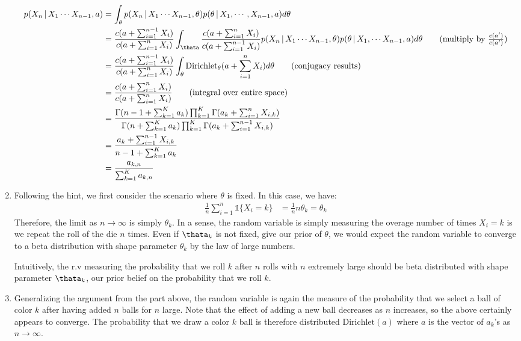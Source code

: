 \documentclass[submit]{harvardml}
\newcommand{\given}{\,|\,}
\theoremstyle{plain}
\begin{document}
\begin{enumerate}[label=(\alph*)]
\begin{align*}
p(X_n \given X_1 \cdots X_{n-1},a) &= \int_{\theta} p(X_n \given  X_1 \cdots X_{n-1}, \theta)p(\theta \given X_1, \cdots, X_{n-1}, a)  d\theta \\
&= \frac{c(a + \sum_{i=1}^{n-1}X_i)}{c(a + \sum_{i=1}^n X_i)} \int_{\thata} \frac{c(a + \sum_{i=1}^n X_i)}{c(a + \sum_{i=1}^{n-1}X_i)} p(X_n \given  X_1 \cdots X_{n-1}, \theta)p(\theta \given X_1, \cdots X_{n-1}, a) d\theta \tag{multiply by $\frac{c(a')}{c(a')}$} \\
&= \frac{c(a + \sum_{i=1}^{n-1}X_i)}{c(a + \sum_{i=1}^n X_i)} \int_{\theta} \text{Dirichlet}_{\theta}(a + \sum_{i=1}^n X_i) d\theta \tag{conjugacy results}\\
&= \frac{c(a + \sum_{i=1}^n X_i)}{c(a + \sum_{i=1}^n X_i)} \tag{integral over entire space} \\
&= \frac{\Gamma(n - 1 + \sum_{k=1}^{K}{a_k})\prod_{k=1}^K \Gamma(a_k + \sum_{i=1}^n X_{i,k})}{\Gamma(n + \sum_{k=1}^K a_k)\prod_{k=1}^K \Gamma(a_k + \sum_{i=1}^{n-1}X_{i,k})} \\
&= \frac{a_k + \sum_{i=1}^{n-1}X_{i,k}}{n - 1 + \sum_{k=1}^K a_k}\\
&= \frac{a_{k,n}}{\sum_{k=1}^K a_{k,n}}
\end{align*}
\item Following the hint, we first consider the scenario where $\theta$ is fixed. In this case, we have:
\begin{align*}
\frac{1}{n} \sum_{i=1}^n \mathbb{1} \{X_i = k\} &= \frac{1}{n}n\theta_k = \theta_k
\end{align*}
Therefore, the limit as $n \to \infty$ is simply $\theta_k$. In a sense, the random variable is simply measuring the overage number of times $X_i = k$ is we repeat the roll of the die $n$ times. Even if $\thata_k$ is not fixed, give our prior of $\theta$, we would expect the random variable to converge to a beta distribution with shape parameter $\theta_k$ by the law of large numbers.

Intuitively, the r.v measuring the probability that we roll $k$ after $n$ rolls with $n$ extremely large should be beta distributed with shape parameter $\thata_k$, our prior belief on the probability that we roll $k$.

\item Generalizing the argument from the part above, the random variable is again the measure of the probability that we select a ball of color $k$ after having added $n$ balls for $n$ large. Note that the effect of adding a new ball decreases as $n$ increases, so the above certainly appears to converge. The probability that we draw a color $k$ ball is therefore distributed $\text{Dirichlet}(a)$ where $a$ is the vector of $a_k$'s as $n \to \infty.$


\end{enumerate}
\end{document}

